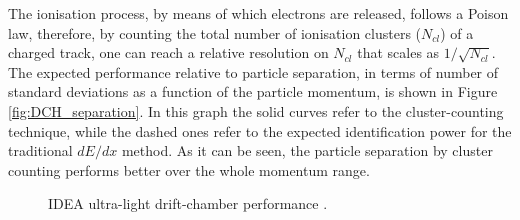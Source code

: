 The ionisation process, by means of which electrons are released, follows a Poison law, therefore, by counting the total number of ionisation clusters ($N_{cl}$) of a charged track, one can reach a relative resolution on $N_{cl}$ that scales as  $1/\sqrt{N_{cl}}$. The expected performance relative to particle separation, in terms of number of standard deviations as a function of the particle momentum, is shown in Figure \ref{fig:DCH_separation}. In this graph the solid curves refer to the cluster-counting technique, while the dashed ones refer to the expected identification power for the traditional $dE/dx$ method. As it can be seen, the particle separation by cluster counting performs better over the whole momentum range.

\begin{figure}
	\centering
	 \quad
	\caption{IDEA ultra-light drift-chamber performance \cite{FCC-ee_design}.}
\end{figure}

